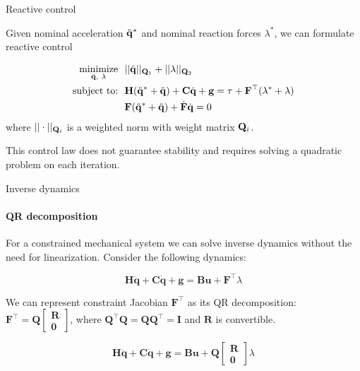 \documentclass{beamer}
\begin{document}
\begin{frame}{Reactive control}
	\begin{flushleft}
		
		Given nominal acceleration $\ddot{\mathbf{q}}^*$ and nominal reaction forces $\lambda^*$, we can formulate reactive control
		
		
		\begin{align}
			\underset{\ddot{\bo{q}}, \ \lambda}{\text{minimize}} \ \ &
			||\ddot{\bo{q}}||_{\bo{Q}_1} + ||\lambda||_{\bo{Q}_2} \\
			\text{subject to:}  \ \ & 
			\bo{H} (\ddot{\bo{q}}^* + \ddot{\bo{q}}) + \bo{C} \dot{\bo{q}} + \bo{g} = \tau + \bo{F}\T (\lambda^* + \lambda) \\
			& \bo{F}(\ddot{\bo{q}}^* + \ddot{\bo{q}}) + \dot{\bo{F}} \dot{\bo{q}} = 0 
		\end{align}		
		where $||\cdot||_{\mathbf{Q}_i}$ is a weighted norm with weight matrix $\mathbf{Q}_i$.
		
		This control law does not guarantee stability and requires solving a quadratic problem on each iteration.
		
	\end{flushleft}
\end{frame}






\begin{frame}{Inverse dynamics}
	\framesubtitle{QR decomposition}
	\begin{flushleft}
		
		For a constrained mechanical system we can solve inverse dynamics without the need for linearization. Consider the following dynamics:
		
		\begin{equation}
			\mathbf{H}\ddot{\mathbf{q}} + \mathbf{C}\dot{\mathbf{q}} + \mathbf{g} = \mathbf{B}\mathbf{u} + \mathbf{F}^\top \lambda
		\end{equation}
		
		We can represent constraint Jacobian $\mathbf{F}^\top$ as its QR decomposition: $\mathbf{F}^\top = \mathbf{Q} \begin{bmatrix} \mathbf{R} \\ \mathbf{0}  \end{bmatrix}$, where $\mathbf{Q}^\top \mathbf{Q} = \mathbf{Q} \mathbf{Q}^\top = \mathbf{I}$ and $\mathbf{R}$ is convertible.
		
		\begin{equation}
			\mathbf{H}\ddot{\mathbf{q}} + \mathbf{C}\dot{\mathbf{q}} + \mathbf{g} = \mathbf{B}\mathbf{u} + \mathbf{Q} \begin{bmatrix} \mathbf{R} \\ \mathbf{0}  \end{bmatrix} \lambda
		\end{equation}
		
		
	\end{flushleft}
\end{frame}
\end{document}
